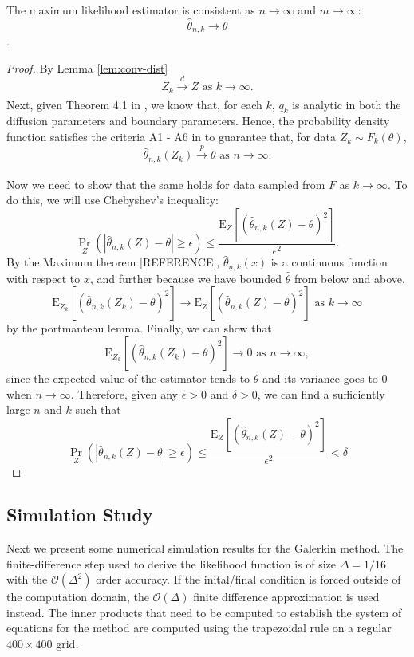 \begin{lemma}
  The maximum likelihood estimator is consistent as $n \to \infty$ and $m \to \infty$:
  \[ \hat{\theta}_{n,k} \to \theta \].
\end{lemma}
\begin{proof}
  By Lemma \ref{lem:conv-dist}
    \[ Z_k \xrightarrow[]{d} Z \mbox { as } k \to \infty. \] Next,
    given Theorem 4.1 in \cite{singler2008differentiability}, we know
    that, for each $k$, $q_k$ is analytic in both the diffusion
    parameters and boundary parameters. Hence, the probability density
    function satisfies the criteria A1 - A6 in
    \cite{casella2002statistical} to guarantee that, for data
    $Z_{k} \sim F_k(\theta)$,
    \[ \hat{\theta}_{n,k}(Z_k) \xrightarrow[]{p} \theta \mbox{ as } n
      \to \infty. \]

    Now we need to show that the same holds for data sampled from $F$
    as $k \to \infty$. To do this, we will use Chebyshev's inequality:
  \[
    \Pr_{Z}\left( \left| \hat{\theta}_{n,k}(Z) - \theta \right| \geq
      \epsilon \right) \leq \frac{ \mbox{E}_{Z}\left[
        (\hat{\theta}_{n,k}(Z) - \theta)^2 \right] }{ \epsilon^2 }.
  \]
  By the Maximum theorem [REFERENCE], $\hat{\theta}_{n,k}(x)$ is a continuous
  function with respect to $x$, and further because we have bounded
  $\hat{\theta}$ from below and above,
  \[
    \mbox{E}_{Z_k}\left[ (\hat{\theta}_{n,k}(Z_k) - \theta)^2 \right]
    \to \mbox{E}_{Z}\left[ (\hat{\theta}_{n,k}(Z) - \theta)^2 \right]
    \mbox{ as } k \to \infty
  \]
  by the portmanteau lemma. Finally, we can show that
  \begin{equation}
    \mbox{E}_{Z_k}\left[ (\hat{\theta}_{n,k}(Z_k) - \theta)^2 \right]
    \to 0 \mbox{ as } n \to \infty, \label{eq:var-lim}
  \end{equation}
  since the expected value of the estimator tends to $\theta$ and its
  variance goes to 0 when $n \to \infty$. Therefore, given any
  $\epsilon > 0$ and $\delta > 0$, we can find a sufficiently large
  $n$ and $k$ such that
  \[
    \Pr_{Z}\left( \left| \hat{\theta}_{n,k}(Z) - \theta \right| \geq
      \epsilon \right) \leq \frac{ \mbox{E}_{Z}\left[
        (\hat{\theta}_{n,k}(Z) - \theta)^2 \right] }{ \epsilon^2 } < \delta    
  \]
\end{proof}

\subsection{Simulation Study}
Next we present some numerical simulation results for the Galerkin
method. The finite-difference step used to derive the likelihood
function is of size $\Delta = 1/16$ with the $\mathcal{O}(\Delta^2)$
order accuracy. If the inital/final condition is forced outside of the
computation domain, the $\mathcal{O}(\Delta)$ finite difference
approximation is used instead. The inner products that need to be
computed to establish the system of equations for the method are
computed using the trapezoidal rule on a regular $400 \times 400$
grid.

